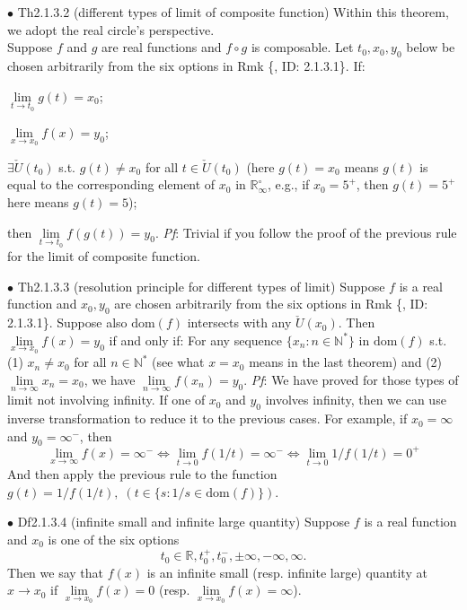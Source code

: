 \documentclass{article}
\begin{document}
\begin{Th}{$\bullet$ Th2.1.3.2 (different types of limit of composite function)}
    Within this theorem, we adopt the real circle's perspective.\\
    Suppose $f$ and $g$ are real functions and $f\circ g$ is composable. Let $t_0, x_0, y_0$ below be chosen arbitrarily from the six options in Rmk \{, ID: 2.1.3.1\}. If:
    \begin{compactenum}
        \item $\lim\limits_{t\rightarrow t_0} g(t) = x_0$;
        \item $\lim\limits_{x\rightarrow x_0} f(x) = y_0$;
        \item $\exists \check{U}(t_0)$ s.t. $g(t)\neq x_0$ for all $t\in\check{U}(t_0)$ (here $g(t)=x_0$ means $g(t)$ is equal to the corresponding element of $x_0$ in $\mathbb{R}_\infty^\circ$, e.g., if $x_0 = 5^+$, then $g(t) = 5^+$ here means $g(t)=5$);
    \end{compactenum}
    then $\lim\limits_{t\rightarrow t_0} f(g(t)) = y_0$.
    \tcblower
    \textit{Pf}: Trivial if you follow the proof of the previous rule for the limit of composite function.
\end{Th}

\begin{Th}{$\bullet$ Th2.1.3.3 (resolution principle for different types of limit)}
    Suppose $f$ is a real function and $x_0, y_0$ are chosen arbitrarily from the six options in Rmk \{, ID: 2.1.3.1\}. Suppose also $\text{dom}(f)$ intersects with any $\check{U}(x_0)$. Then $\lim\limits_{x\to x_0} f(x) = y_0$ if and only if:
    For any sequence $\{x_n: n\in\mathbb{N^\ast}\}$ in $\text{dom}(f)$ s.t. (1) $x_n\neq x_0$ for all $n\in\mathbb{N^\ast}$ (see what $x=x_0$ means in the last theorem) and (2) $\lim\limits_{n\to\infty} x_n = x_0$, we have $\lim\limits_{n\to\infty} f(x_n) = y_0$.
    \tcblower
    \textit{Pf}: We have proved for those types of limit not involving infinity. If one of $x_0$ and $y_0$ involves infinity, then we can use inverse transformation to reduce it to the previous cases. For example, if $x_0 = \infty$ and $y_0 = \infty^-$, then
    $$ \lim\limits_{x\to\infty} f(x) = \infty^- \Leftrightarrow \lim\limits_{t\to 0} f(1/t) = \infty^- \Leftrightarrow \lim\limits_{t\to 0} 1/f(1/t) = 0^+$$
    And then apply the previous rule to the function $g(t) = 1/f(1/t),\; (t\in \{s: 1/s\in\text{dom}(f)\})$.
\end{Th}

\begin{Df}{$\bullet$ Df2.1.3.4 (infinite small and infinite large quantity)}
    Suppose $f$ is a real function and $x_0$ is one of the six options
    $$ t_0\in\mathbb{R}, t_0^+, t_0^-, \pm\infty, -\infty, \infty. $$
    Then we say that $f(x)$ is an infinite small (resp. infinite large) quantity at $x\rightarrow x_0$ if $\lim\limits_{x\to x_0} f(x) = 0$ (resp. $\lim\limits_{x\to x_0} f(x) = \infty$).
\end{Df}
\end{document}
